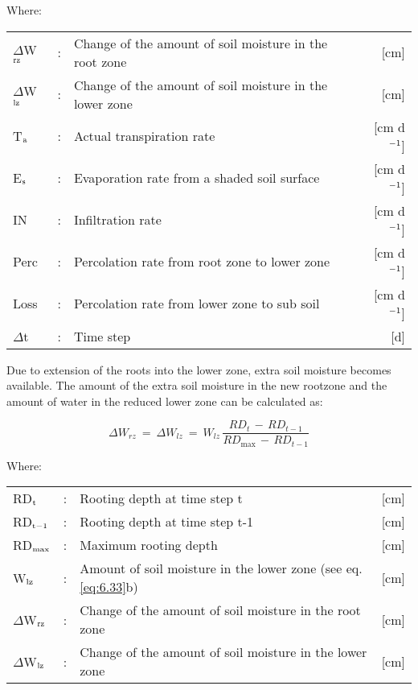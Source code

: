 Where:\\[5pt]
\begin{tabularx}{\textwidth}{llXr}
	$\Delta$W$_{{\rm rz}}$ &:& Change of the amount of soil moisture in the root zone  & [cm]\\
	$\Delta$W$_{{\rm lz}}$ &:& Change of the amount of soil moisture in the lower zone  & [cm]\\
	T$_{{\rm a}}$ &:& Actual transpiration rate   & [cm d$^{{\rm -1}}$]\\
	E$_{{\rm s}}$ &:& Evaporation rate from a shaded soil surface  & [cm d$^{{\rm -1}}$]\\
	IN &:& Infiltration rate  & [cm d$^{{\rm -1}}$]\\
	Perc &:& Percolation rate from root zone to lower zone  & [cm d$^{{\rm -1}}$]\\
	Loss &:& Percolation rate from lower zone to sub soil  & [cm d$^{{\rm -1}}$]\\
	$\Delta$t &:& Time step  & [d]\\
\end{tabularx}

Due to extension of the roots into the lower zone, extra soil moisture becomes available.
The amount of the extra soil moisture in the new rootzone and the amount of water in the
reduced lower zone can be calculated as:

\begin{equation}
\label{eq:6.32}
\Delta W _{rz} ~=~\Delta W _{lz} ~=~ W _{lz} \,{\frac{ RD _{t} \, -\, RD _{t-1} }{RD _{\max } \, -\, RD _{t-1} }}
\end{equation}

Where:\\[5pt]
\begin{tabularx}{\textwidth}{llXr}
	RD$_{{\rm t}}$ &:& Rooting depth at time step t  & [cm]\\
	RD$_{{\rm t-1}}$ &:& Rooting depth at time step t-1  & [cm]\\
	RD$_{{\rm max}}$ &:& Maximum rooting depth  & [cm]\\
	W$_{{\rm lz}}$ &:& Amount of soil moisture in the lower zone (see eq. \ref{eq:6.33}b)  & [cm]\\
	$\Delta$W$_{{\rm rz}}$ &:& Change of the amount of soil moisture in the root zone  & [cm]\\
	$\Delta$W$_{{\rm lz}}$ &:& Change of the amount of soil moisture in the lower zone  & [cm]\\
\end{tabularx}

